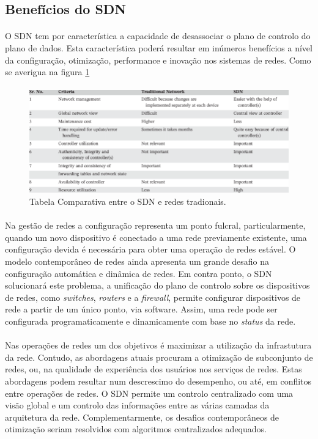 \documentclass{llncs}
\begin{document}
\subsection{Benefícios do SDN}
\paragraph{}
O SDN tem por característica a capacidade de desassociar o plano de controlo do plano de dados. Esta característica poderá resultar em inúmeros benefícios a nível da 
configuração, otimização, performance e inovação nos sistemas de redes. Como se averigua na figura \ref{fig:tabela}
\paragraph{}
\begin{figure}
\begin{center}
\includegraphics[scale=0.40]{tabela.png} 
\end{center}
\caption{Tabela Comparativa entre o SDN e redes tradionais.}
\label{fig:tabela}
\end{figure} 
\paragraph{}
Na gestão de redes a configuração representa um ponto fulcral, particularmente, quando um novo dispositivo é conectado a uma rede previamente existente, uma configuração
devida é necessária para obter uma operação de redes estável. O modelo contemporâneo de redes ainda apresenta um grande desafio na configuração automática e dinâmica de redes.
Em contra ponto, o SDN solucionará este problema, a unificação do plano de controlo sobre os dispositivos de redes, como \textit{switches}, \textit{routers} e a \textit{firewall},
permite configurar dispositivos de rede a partir de um único ponto, via software. Assim, uma rede pode ser configurada programaticamente e dinamicamente com base no \textit{status} da rede. \cite{paper1}
\paragraph{}
Nas operações de redes um dos objetivos é maximizar a utilização da infrastutura da rede. Contudo, as abordagens atuais procuram a otimização de subconjunto de redes, ou,
na qualidade de experiência dos usuários nos serviços de redes. Estas abordagens podem resultar num descrescimo do desempenho, ou até, em conflitos entre operações de redes. 
O SDN permite um controlo centralizado com uma visão global e um controlo das informações entre as várias camadas da arquitetura da rede. Complementarmente, os desafios contemporâneos
de otimização seriam resolvidos com algoritmos centralizados adequados.
\end{document}
